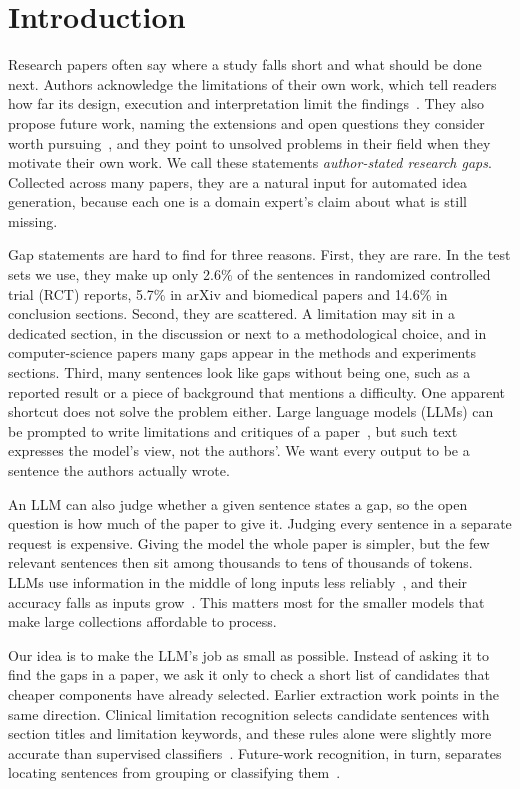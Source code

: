 \section{Introduction}
\label{sec:introduction}

Research papers often say where a study falls short and what should be done next. Authors acknowledge the limitations of their own work, which tell readers how far its design, execution and interpretation limit the findings~\cite{kilicoglu2018automatic,lan2024automatic}. They also propose future work, naming the extensions and open questions they consider worth pursuing~\cite{zhu2019recognizing,zhang2023fws}, and they point to unsolved problems in their field when they motivate their own work. We call these statements \emph{author-stated research gaps}. Collected across many papers, they are a natural input for automated idea generation, because each one is a domain expert's claim about what is still missing.

Gap statements are hard to find for three reasons. First, they are rare. In the test sets we use, they make up only 2.6\% of the sentences in randomized controlled trial (RCT) reports, 5.7\% in arXiv and biomedical papers and 14.6\% in conclusion sections. Second, they are scattered. A limitation may sit in a dedicated section, in the discussion or next to a methodological choice, and in computer-science papers many gaps appear in the methods and experiments sections. Third, many sentences look like gaps without being one, such as a reported result or a piece of background that mentions a difficulty. One apparent shortcut does not solve the problem either. Large language models (LLMs) can be prompted to write limitations and critiques of a paper~\cite{xu2025llms,mishra2026tree}, but such text expresses the model's view, not the authors'. We want every output to be a sentence the authors actually wrote.

An LLM can also judge whether a given sentence states a gap, so the open question is how much of the paper to give it. Judging every sentence in a separate request is expensive. Giving the model the whole paper is simpler, but the few relevant sentences then sit among thousands to tens of thousands of tokens. LLMs use information in the middle of long inputs less reliably~\cite{liu2024lost}, and their accuracy falls as inputs grow~\cite{hsieh2024ruler}. This matters most for the smaller models that make large collections affordable to process.

Our idea is to make the LLM's job as small as possible. Instead of asking it to find the gaps in a paper, we ask it only to check a short list of candidates that cheaper components have already selected. Earlier extraction work points in the same direction. Clinical limitation recognition selects candidate sentences with section titles and limitation keywords, and these rules alone were slightly more accurate than supervised classifiers~\cite{kilicoglu2018automatic}. Future-work recognition, in turn, separates locating sentences from grouping or classifying them~\cite{zhu2019recognizing,zhang2023fws}.

